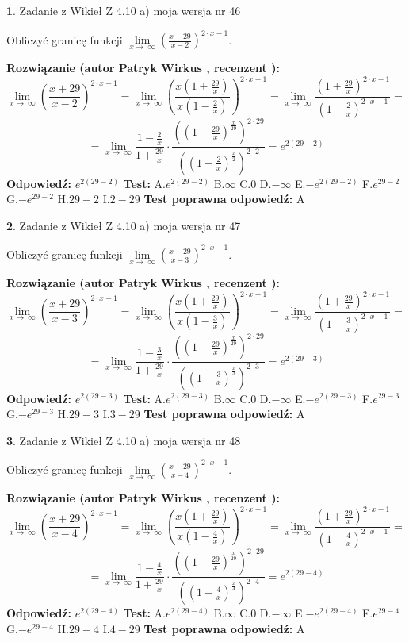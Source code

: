 \documentclass[12pt, a4paper]{article}
\theoremstyle{definition} %
\newtheorem{zad}{}
\newcommand{\zadStart}[1]{\begin{zad}#1\newline}
\newcommand{\zadStop}{\end{zad}}
\newcommand{\rozwStart}[2]{\noindent \textbf{Rozwiązanie (autor #1 , recenzent #2): }\newline}
\newcommand{\rozwStop}{\newline}
\newcommand{\odpStart}{\noindent \textbf{Odpowiedź:}\newline}
\newcommand{\odpStop}{\newline}
\newcommand{\testStart}{\noindent \textbf{Test:}\newline}
\newcommand{\testStop}{\newline}
\newcommand{\kluczStart}{\noindent \textbf{Test poprawna odpowiedź:}\newline}
\newcommand{\kluczStop}{\newline}
\begin{document}
\zadStart{Zadanie z Wikieł Z 4.10 a) moja wersja nr 46}


Obliczyć granicę funkcji  $\lim\limits_{x\to\ \infty}(\frac{x+29}{x-2})^{2\cdot x-1}$.
\zadStop
\rozwStart{Patryk Wirkus}{}
$$\lim\limits_{x\to\ \infty}(\frac{x+29}{x-2})^{2\cdot x-1} = \lim\limits_{x\to\ \infty}(\frac{x(1+\frac{29}{x})}{x(1-\frac{2}{x})})^{2\cdot x-1}=\lim\limits_{x\to\ \infty}\frac{(1+\frac{29}{x})^{2\cdot x-1}}{(1-\frac{2}{x})^{2\cdot x-1}}=$$
$$=\lim\limits_{x\to\ \infty}\frac{1-\frac{2}{x}}{1+\frac{29}{x}}\cdot\frac{((1+\frac{29}{x})^{\frac{x}{29}})^{2\cdot29}}{((1-\frac{2}{x})^{\frac{x}{2}})^{2\cdot2}}=e^{2(29-2)}$$
\rozwStop
\odpStart
$e^{2(29-2)}$
\odpStop
\testStart
A.$e^{2(29-2)}$ B.$\infty$ C.$0$ D.$-\infty$ E.$-e^{2(29-2)}$
F.$e^{29-2}$ G.$-e^{29-2}$
H.$29-2$
I.$2-29$
\testStop
\kluczStart
A
\kluczStop



\zadStart{Zadanie z Wikieł Z 4.10 a) moja wersja nr 47}


Obliczyć granicę funkcji  $\lim\limits_{x\to\ \infty}(\frac{x+29}{x-3})^{2\cdot x-1}$.
\zadStop
\rozwStart{Patryk Wirkus}{}
$$\lim\limits_{x\to\ \infty}(\frac{x+29}{x-3})^{2\cdot x-1} = \lim\limits_{x\to\ \infty}(\frac{x(1+\frac{29}{x})}{x(1-\frac{3}{x})})^{2\cdot x-1}=\lim\limits_{x\to\ \infty}\frac{(1+\frac{29}{x})^{2\cdot x-1}}{(1-\frac{3}{x})^{2\cdot x-1}}=$$
$$=\lim\limits_{x\to\ \infty}\frac{1-\frac{3}{x}}{1+\frac{29}{x}}\cdot\frac{((1+\frac{29}{x})^{\frac{x}{29}})^{2\cdot29}}{((1-\frac{3}{x})^{\frac{x}{3}})^{2\cdot3}}=e^{2(29-3)}$$
\rozwStop
\odpStart
$e^{2(29-3)}$
\odpStop
\testStart
A.$e^{2(29-3)}$ B.$\infty$ C.$0$ D.$-\infty$ E.$-e^{2(29-3)}$
F.$e^{29-3}$ G.$-e^{29-3}$
H.$29-3$
I.$3-29$
\testStop
\kluczStart
A
\kluczStop



\zadStart{Zadanie z Wikieł Z 4.10 a) moja wersja nr 48}


Obliczyć granicę funkcji  $\lim\limits_{x\to\ \infty}(\frac{x+29}{x-4})^{2\cdot x-1}$.
\zadStop
\rozwStart{Patryk Wirkus}{}
$$\lim\limits_{x\to\ \infty}(\frac{x+29}{x-4})^{2\cdot x-1} = \lim\limits_{x\to\ \infty}(\frac{x(1+\frac{29}{x})}{x(1-\frac{4}{x})})^{2\cdot x-1}=\lim\limits_{x\to\ \infty}\frac{(1+\frac{29}{x})^{2\cdot x-1}}{(1-\frac{4}{x})^{2\cdot x-1}}=$$
$$=\lim\limits_{x\to\ \infty}\frac{1-\frac{4}{x}}{1+\frac{29}{x}}\cdot\frac{((1+\frac{29}{x})^{\frac{x}{29}})^{2\cdot29}}{((1-\frac{4}{x})^{\frac{x}{4}})^{2\cdot4}}=e^{2(29-4)}$$
\rozwStop
\odpStart
$e^{2(29-4)}$
\odpStop
\testStart
A.$e^{2(29-4)}$ B.$\infty$ C.$0$ D.$-\infty$ E.$-e^{2(29-4)}$
F.$e^{29-4}$ G.$-e^{29-4}$
H.$29-4$
I.$4-29$
\testStop
\kluczStart
A
\kluczStop
\end{document}
